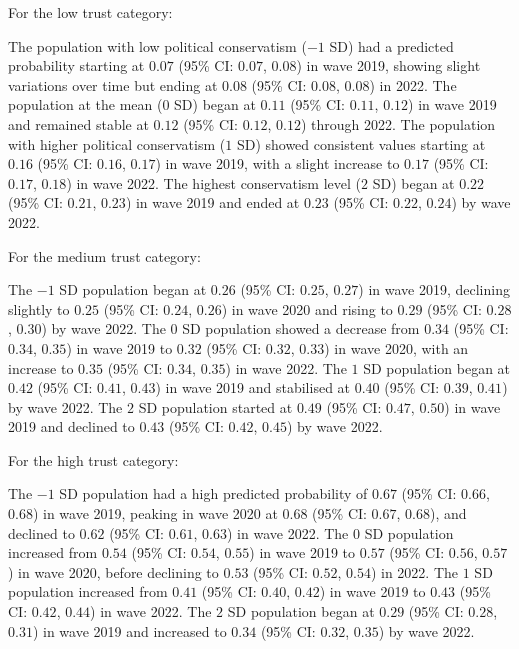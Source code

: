 \documentclass[
  single column]{article}
\begin{document}
For the low trust category:

The population with low political conservatism (\(-1\) SD) had a
predicted probability starting at \(0.07\) (95\% CI: \(0.07\), \(0.08\))
in wave 2019, showing slight variations over time but ending at \(0.08\)
(95\% CI: \(0.08\), \(0.08\)) in 2022. The population at the mean (\(0\)
SD) began at \(0.11\) (95\% CI: \(0.11\), \(0.12\)) in wave 2019 and
remained stable at \(0.12\) (95\% CI: \(0.12\), \(0.12\)) through 2022.
The population with higher political conservatism (\(1\) SD) showed
consistent values starting at \(0.16\) (95\% CI: \(0.16\), \(0.17\)) in
wave 2019, with a slight increase to \(0.17\) (95\% CI: \(0.17\),
\(0.18\)) in wave 2022. The highest conservatism level (\(2\) SD) began
at \(0.22\) (95\% CI: \(0.21\), \(0.23\)) in wave 2019 and ended at
\(0.23\) (95\% CI: \(0.22\), \(0.24\)) by wave 2022.

For the medium trust category:

The \(-1\) SD population began at \(0.26\) (95\% CI: \(0.25\), \(0.27\))
in wave 2019, declining slightly to \(0.25\) (95\% CI: \(0.24\),
\(0.26\)) in wave 2020 and rising to \(0.29\) (95\% CI: \(0.28\),
\(0.30\)) by wave 2022. The \(0\) SD population showed a decrease from
\(0.34\) (95\% CI: \(0.34\), \(0.35\)) in wave 2019 to \(0.32\) (95\%
CI: \(0.32\), \(0.33\)) in wave 2020, with an increase to \(0.35\) (95\%
CI: \(0.34\), \(0.35\)) in wave 2022. The \(1\) SD population began at
\(0.42\) (95\% CI: \(0.41\), \(0.43\)) in wave 2019 and stabilised at
\(0.40\) (95\% CI: \(0.39\), \(0.41\)) by wave 2022. The \(2\) SD
population started at \(0.49\) (95\% CI: \(0.47\), \(0.50\)) in wave
2019 and declined to \(0.43\) (95\% CI: \(0.42\), \(0.45\)) by wave
2022.

For the high trust category:

The \(-1\) SD population had a high predicted probability of \(0.67\)
(95\% CI: \(0.66\), \(0.68\)) in wave 2019, peaking in wave 2020 at
\(0.68\) (95\% CI: \(0.67\), \(0.68\)), and declined to \(0.62\) (95\%
CI: \(0.61\), \(0.63\)) in wave 2022. The \(0\) SD population increased
from \(0.54\) (95\% CI: \(0.54\), \(0.55\)) in wave 2019 to \(0.57\)
(95\% CI: \(0.56\), \(0.57\)) in wave 2020, before declining to \(0.53\)
(95\% CI: \(0.52\), \(0.54\)) in 2022. The \(1\) SD population increased
from \(0.41\) (95\% CI: \(0.40\), \(0.42\)) in wave 2019 to \(0.43\)
(95\% CI: \(0.42\), \(0.44\)) in wave 2022. The \(2\) SD population
began at \(0.29\) (95\% CI: \(0.28\), \(0.31\)) in wave 2019 and
increased to \(0.34\) (95\% CI: \(0.32\), \(0.35\)) by wave 2022.
\end{document}
